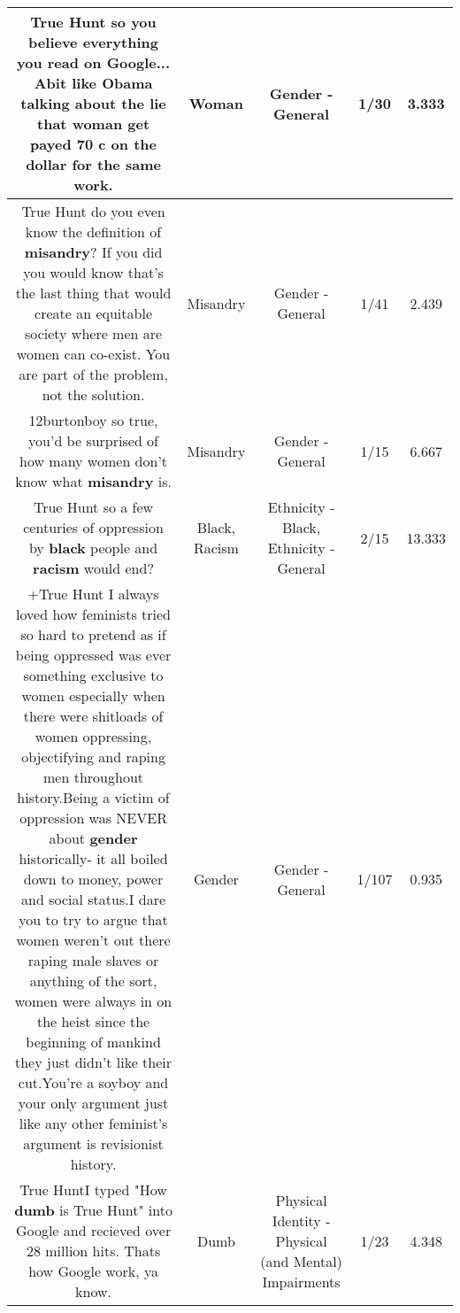 \documentclass[11pt]{article}
\newlength\mylength
\begin{document}
\begin{center}
\begin{longtable}{|C{.65\mylength}|C{.30\mylength}|C{.12\mylength}|C{.12\mylength}|C{.12\mylength}|}
  \small True Hunt so you believe everything you read on Google... Abit like Obama talking about the lie that \textbf{woman} get payed 70 c on the dollar for the same work.\normalsize   & Woman & Gender - General & 1/30 & 3.333 \\  \hline
  \small True Hunt do you even know the definition of \textbf{misandry}? If you did you would know that's the last thing that would create an equitable society where men are women can co-exist. You are part of the problem, not the solution.\normalsize   & Misandry & Gender - General & 1/41 & 2.439 \\  \hline
  \small 12burtonboy so true, you'd be surprised of how many women don't know what \textbf{misandry} is.\normalsize   & Misandry & Gender - General & 1/15 & 6.667 \\  \hline
  \small True Hunt so a few centuries of oppression by \textbf{black} people and \textbf{racism} would end?\normalsize   & Black, Racism & Ethnicity - Black, Ethnicity - General & 2/15 & 13.333 \\  \hline
  \small +True Hunt I always loved how feminists tried so hard to pretend as if being oppressed was ever something exclusive to women especially when there were shitloads of women oppressing, objectifying and raping men throughout history.Being a victim of oppression was NEVER about \textbf{gender} historically- it all boiled down to money, power and social status.I dare you to try to argue that women weren't out there raping male slaves or anything of the sort, women were always in on the heist since the beginning of mankind they just didn't like their cut.You're a soyboy and your only argument just like any other feminist's argument is revisionist history.\normalsize   & Gender & Gender - General & 1/107 & 0.935 \\  \hline
  \small True HuntI typed "How \textbf{dumb} is True Hunt" into Google and recieved over 28 million hits. Thats how Google work, ya know.\normalsize   & Dumb & Physical Identity - Physical (and Mental) Impairments & 1/23 & 4.348 \\  \hline

\end{longtable}
\end{center}
\end{document}
